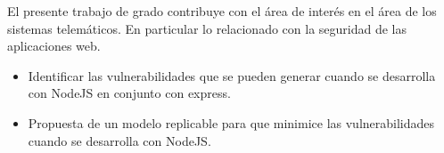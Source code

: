 
El presente trabajo de grado contribuye con el área de interés en el área de los sistemas telemáticos. En particular lo relacionado con la seguridad de las aplicaciones web.

\begin{itemize}
    \item Identificar las vulnerabilidades que se pueden generar cuando se desarrolla con NodeJS en conjunto con express.
    \item Propuesta de un modelo replicable para que minimice las vulnerabilidades cuando se desarrolla con NodeJS.
\end{itemize}

